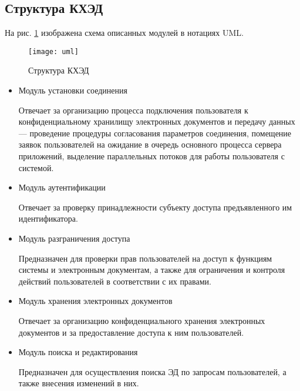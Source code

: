 \subsection{Структура КХЭД} \label{storage}

На рис. \ref{img:uml} изображена схема описанных модулей в нотациях UML.

\begin{figure}[p]
  \centering
  \texttt{[image: uml]}
  \caption{Структура КХЭД}
  \label{img:uml}
\end{figure}

\begin{itemize}
\item Модуль установки соединения

Отвечает за организацию процесса подключения пользователя к конфиденциальному хранилищу электронных документов и передачу данных --- проведение процедуры согласования параметров соединения, помещение заявок пользователей на ожидание в очередь основного процесса сервера приложений, выделение параллельных потоков для работы пользователя с системой.

\item Модуль аутентификации

Отвечает за проверку принадлежности субъекту доступа предъявленного им идентификатора.

\item Модуль разграничения доступа

Предназначен для проверки прав пользователей на доступ к функциям системы и электронным документам, а также для ограничения и контроля действий пользователей в соответствии с их правами.

\item Модуль хранения электронных документов

Отвечает за организацию конфиденциального хранения электронных документов и за предоставление доступа к ним пользователей.

\item Модуль поиска и редактирования

Предназначен для осуществления поиска ЭД по запросам пользователей, а также внесения изменений в них.

\end{itemize}
